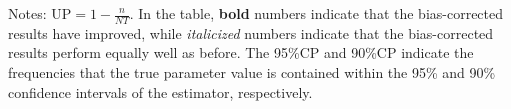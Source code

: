 \documentclass[11pt,a4paper]{article}
\begin{document}
\begin{landscape}
\begin{table}[p]
\begin{threeparttable}
{{\begin{tabular}{ccrrrrrrccrrrrrr}
\end{tabular}}}
\par\smallskip
\begin{minipage}[t]{0.86\linewidth}
\footnotesize
Notes: $\mathrm{UP}=1-\frac{n}{NT}$. In the table, \textbf{bold} numbers indicate that the bias-corrected results have improved, while \textit{italicized} numbers indicate that the bias-corrected results perform equally well as before. 
The 95\%CP and 90\%CP  indicate the frequencies that the true parameter value is contained within the 95\% and 90\% confidence intervals of the estimator, respectively.
\end{minipage}
\end{threeparttable}
\end{table}
\end{landscape}
\end{document}
